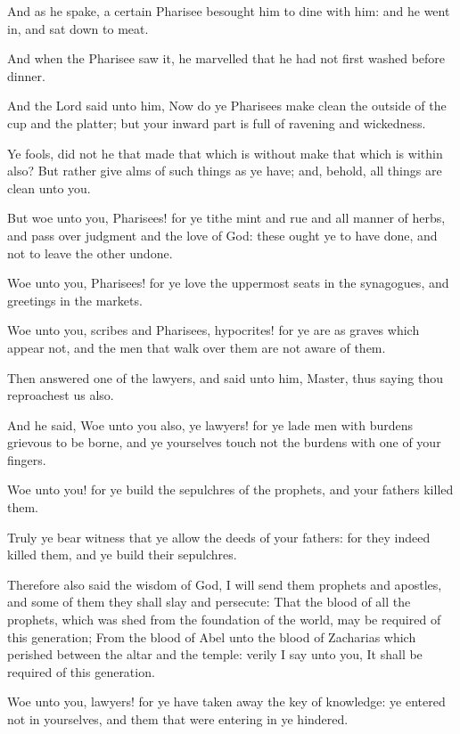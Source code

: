 \Verse And as he spake, a certain Pharisee besought him to dine with him: and he went in, and sat down to meat.

\Verse And when the Pharisee saw it, he marvelled that he had not first washed before dinner.

\Verse And the Lord said unto him, Now do ye Pharisees make clean the outside of the cup and the platter; but your inward part is full of ravening and wickedness.

\Verse Ye fools, did not he that made that which is without make that which is within also?  \Verse But rather give alms of such things as ye have; and, behold, all things are clean unto you.

\Verse But woe unto you, Pharisees! for ye tithe mint and rue and all manner of herbs, and pass over judgment and the love of God: these ought ye to have done, and not to leave the other undone.

\Verse Woe unto you, Pharisees! for ye love the uppermost seats in the synagogues, and greetings in the markets.

\Verse Woe unto you, scribes and Pharisees, hypocrites! for ye are as graves which appear not, and the men that walk over them are not aware of them.

\Verse Then answered one of the lawyers, and said unto him, Master, thus saying thou reproachest us also.

\Verse And he said, Woe unto you also, ye lawyers! for ye lade men with burdens grievous to be borne, and ye yourselves touch not the burdens with one of your fingers.

\Verse Woe unto you! for ye build the sepulchres of the prophets, and your fathers killed them.

\Verse Truly ye bear witness that ye allow the deeds of your fathers: for they indeed killed them, and ye build their sepulchres.

\Verse Therefore also said the wisdom of God, I will send them prophets and apostles, and some of them they shall slay and persecute: \Verse That the blood of all the prophets, which was shed from the foundation of the world, may be required of this generation; \Verse From the blood of Abel unto the blood of Zacharias which perished between the altar and the temple: verily I say unto you, It shall be required of this generation.

\Verse Woe unto you, lawyers! for ye have taken away the key of knowledge: ye entered not in yourselves, and them that were entering in ye hindered.

